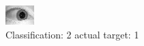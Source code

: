 \begin{figure}[h!]
\begin{center}
\includegraphics[width=0.60\columnwidth]{figures/ID1590_class_2_target_1.png}
\end{center}
\caption{ Classification: 2 actual target: 1}
\label{fig:ID1590_class_2_target_1}
\end{figure}
